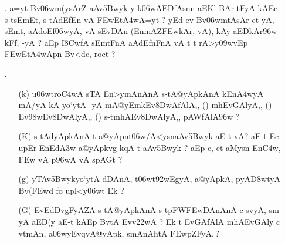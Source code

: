 \begin{itemize}
 \item[{\dn \dnnum \rn{29}}.] {\dn a=y\?t Bv\306wm(ysAr\?Z aAv\35Bwyk y k\?\306wAEDfAsn\?n aEKl{\rs -\re}BAr\- tFyA kAEc s\2-tsEmEt, s\2-tAd\?EfEn vA \3FEwEt\3A4wA=y\?t {\rs ?\re} yEd ev Bv\306wmtAsAr et-yA, sEmt\?, aAdoEf\306wyA, vA s\2EvDAn\2 {\rs (\re}EnmA\0Z\3FEwkAr, vA{\rs ),\re} kAy\0 aEDkAr\396w kFf, -yA {\rs ?\re} aEp I\38CwfA\2 sEmtFnA aAd\?EfnFnA\2 vA t\? t\? rA>y\?\309wvEp \3FEwEt\3A4wApn\2 Bv<dc, roc\?t {\rs ?\re}}
 
 \item[{\dn \dnnum \rn{30}}.] \begin{itemize}
                 
                 \item[({\dn k})] {\dn u\306wtro\3C4wA s\2TA En>ymAnAnA\2 s\2-tA@yApkAnA\2 kEn\3A4wyA mA/yA kA yo`ytA -yA mA@yEmk\-Ev\38DwAfAlA,{\rs ,\re} {\rs (\re}{\dn \dnnum {}}{\rs )\re} mhEvGAlyA,{\rs ,\re} {\rs (\re}{\dn \dnnum {}}{\rs )\re} Ev\398w\-Ev\38DwA\-lyA,{\rs ,\re} {\rs (\re}{\dn\dnnum {}}{\rs )\re} s\2-tmhAEv\38DwAlyA,{\rs ,\re} pAWfAlA\396w {\rs ?\re}}
                 
                 \item[({\dn K})] {\dn s\2-tAdyApkAnA\2 t\? a@yApnt\306w/A<ysn\break aAv\35Bwyk aE-t vA{\rs ?\re} aE-t Ec upEr EnEd\3A3w\? a@yApkvg\?{\qvb} k\?qA\2 t aAv\35Bwyk {\rs ?\re} aEp c{\rs ,\re} et aMysn\2 En\3C4w\?, \3FEw vA p\396wA vA s\2pAG\?t {\rs ?\re}} 
                 
                 \item[({\dn g})] {\dn yTAv\35Bwykyo`ytA\2 dDAnA, t\306wt\392wEg\0yA, a@yApkA, pyA\0\3D8wtyA Bv(\3FEwd\?\- fo upl<y\306wt\? Ek {\rs ?\re}}
                 
                 \item[({\dn G})] {\dn EvEdDvgF{\qvb}yAZA\2 s\2-tA@yApkAnA\2 s\2-tpFW\3FEwDAnAnA\2 c s\?vyA, sm\- yA aED(y aE-t kAEp BvtA\2 Evv\322wA {\rs ?\re} Ek\2  t\? EvGAfAlA mhAEvGAly\? c vt\0mAn\4, a\306wyEvqyA@yApk\4, smAnAh\0tA\2 \3FEwpZFyA,\,{\rs ?\re}}  
                 \end{itemize}
\end{itemize}

